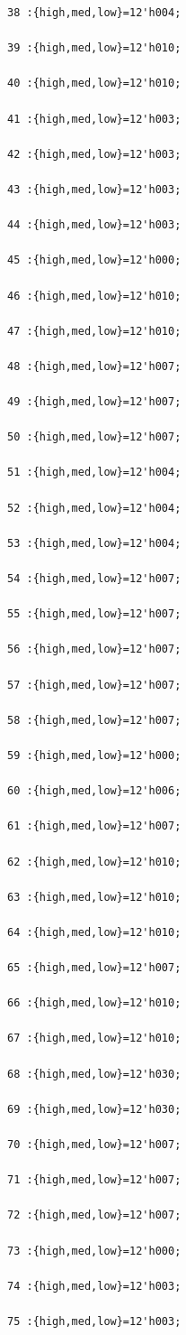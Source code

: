 \documentclass[UTF8]{ctexart}
\begin{document}
\begin{verbatim}
38 :{high,med,low}=12'h004;

39 :{high,med,low}=12'h010;

40 :{high,med,low}=12'h010;

41 :{high,med,low}=12'h003;

42 :{high,med,low}=12'h003;

43 :{high,med,low}=12'h003;

44 :{high,med,low}=12'h003;

45 :{high,med,low}=12'h000;

46 :{high,med,low}=12'h010;

47 :{high,med,low}=12'h010;

48 :{high,med,low}=12'h007;

49 :{high,med,low}=12'h007;

50 :{high,med,low}=12'h007;

51 :{high,med,low}=12'h004;

52 :{high,med,low}=12'h004;

53 :{high,med,low}=12'h004;

54 :{high,med,low}=12'h007;

55 :{high,med,low}=12'h007;

56 :{high,med,low}=12'h007;

57 :{high,med,low}=12'h007;

58 :{high,med,low}=12'h007;

59 :{high,med,low}=12'h000;

60 :{high,med,low}=12'h006;

61 :{high,med,low}=12'h007;

62 :{high,med,low}=12'h010;

63 :{high,med,low}=12'h010;

64 :{high,med,low}=12'h010;

65 :{high,med,low}=12'h007;

66 :{high,med,low}=12'h010;

67 :{high,med,low}=12'h010;

68 :{high,med,low}=12'h030;

69 :{high,med,low}=12'h030;

70 :{high,med,low}=12'h007;

71 :{high,med,low}=12'h007;

72 :{high,med,low}=12'h007;

73 :{high,med,low}=12'h000;

74 :{high,med,low}=12'h003;

75 :{high,med,low}=12'h003;


\end{verbatim}
\end{document}
